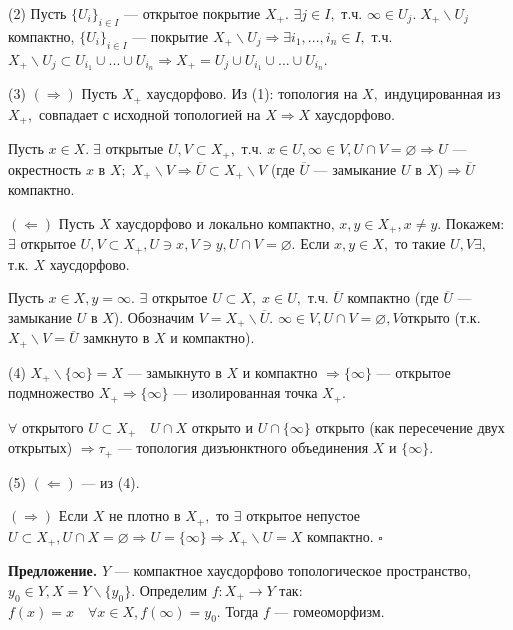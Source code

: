 \documentclass[12pt,a4paper]{article}
\begin{document}
(2) Пусть $\{U_{i}\}_{i \in I}$ --- открытое покрытие $X_{+}.$ $\exists j \in I,$ т.ч. $\infty \in U_{j}. \; X_{+} \backslash U_{j}$ компактно, $\{U_{i}\}_{i \in I}$ --- покрытие $X_{+} \backslash U_{j} \Rightarrow \exists i_{1}, ..., i_{n} \in I,$ т.ч. $X_{+} \backslash U_{j} \subset U_{i_{1}} \cup ... \cup U_{i_{n}} \Rightarrow X_{+} = U_{j} \cup U_{i_{1}} \cup ... \cup U_{i_{n}}.$

(3) $(\Rightarrow)$ Пусть $X_{+}$ хаусдорфово. Из (1): топология на $X,$ индуцированная из $X_{+},$ совпадает с исходной топологией на $X \Rightarrow X$ хаусдорфово. 

Пусть $x \in X. \; \exists$ открытые $U, V \subset X_{+},$ т.ч. $x \in U, \infty \in V, U \cap V = \varnothing \Rightarrow U$ --- окрестность $x$ в $X; \; X_{+} \backslash V \Rightarrow \overline{U} \subset X_{+} \backslash V$ (где $\overline{U}$ --- замыкание $U$ в $X) \Rightarrow \overline{U}$ компактно.

$(\Leftarrow)$ Пусть $X$ хаусдорфово и локально компактно, $x, y \in X_{+}, x \neq y.$ Покажем: $\exists$ открытое $U, V \subset X_{+}, U \ni x, V \ni y, U \cap V = \varnothing.$ Если $x, y \in X,$ то такие $U, V \exists,$ т.к. $X$ хаусдорфово.

Пусть $x \in X, y = \infty.$ $\exists$ открытое $U \subset X, \; x \in U,$ т.ч. $\overline{U}$ компактно (где $\overline{U}$ --- замыкание $U$ в $X$). Обозначим $V = X_{+} \backslash \overline{U}.$ $\infty \in V, U \cap V = \varnothing, V$открыто (т.к. $X_{+} \backslash V = \overline{U}$ замкнуто в $X$ и компактно).

(4) $X_{+} \backslash \{\infty\} = X$ --- замыкнуто в $X$ и компактно $\Rightarrow \{\infty\}$ --- открытое подмножество $X_{+} \Rightarrow \{\infty\}$ --- изолированная точка $X_{+}.$ 

$\forall$ открытого $U \subset X_{+} \quad U \cap X$ открыто и $U \cap \{\infty\}$ открыто (как пересечение двух открытых) $\Rightarrow \tau_{+}$ --- топология дизъюнктного объединения $X$ и $\{\infty\}.$

(5) $(\Leftarrow)$ --- из (4). 

$(\Rightarrow)$ Если $X$ не плотно в $X_{+},$ то $\exists$ открытое непустое $U \subset X_{+}, U \cap X = \varnothing \Rightarrow U = \{\infty\} \Rightarrow  X_{+} \backslash U = X$ компактно. $\square$ 

\textbf{Предложение.} $Y$ --- компактное хаусдорфово топологическое пространство, $y_{0} \in Y, X = Y \backslash \{y_{0}\}.$ Определим $f\!: X_{+} \to Y$ так: $f(x) = x \quad \forall x \in X, f(\infty) = y_{0}.$ Тогда $f$ --- гомеоморфизм.
\end{document}
